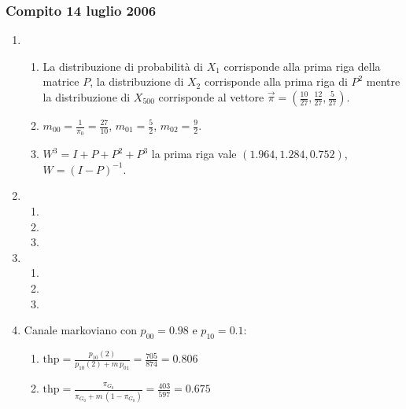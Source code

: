 \documentclass{article}
\begin{document}
\subsubsection{Compito 14 luglio 2006}
\begin{enumerate}
    \item\begin{enumerate}[label=\alph*)]
        \item La distribuzione di probabilità di $X_1$ corrisponde alla prima riga della matrice $P$, la distribuzione di $X_2$ corrisponde alla prima riga di $P^2$ mentre la distribuzione di $X_{500}$ corrisponde al vettore $\vec{\pi} = (\frac{10}{27},\frac{12}{27},\frac{5}{27})$.
        \item $m_{00} = \frac{1}{\pi_0} = \frac{27}{10}$, $m_{01} = \frac{5}{2}$, $m_{02} = \frac{9}{2}$.
        \item $W^3 = I + P + P^2 + P^3$ la prima riga vale $(1.964,1.284,0.752)$, $W=(I-P)^{-1}$.
    \end{enumerate}
    
    \item\begin{enumerate}[label=\alph*)]
        \item
        \item
        \item
    \end{enumerate}
    
    \item\begin{enumerate}[label=\alph*)]
        \item
        \item
        \item
    \end{enumerate}
    
    \item Canale markoviano con $p_{00} = 0.98$ e $p_{10} = 0.1$:
    \begin{enumerate}[label=\alph*)]
        \item $\text{thp} = \frac{p_{10}(2)}{p_{10}(2)+m\,p_{01}} = \frac{705}{874} = 0.806$
        \item $\text{thp} = \frac{\pi_{G_0}}{\pi_{G_0}+m\,(1-\pi_{G_0})} = \frac{403}{597} = 0.675$
    \end{enumerate}
\end{enumerate}
\end{document}
